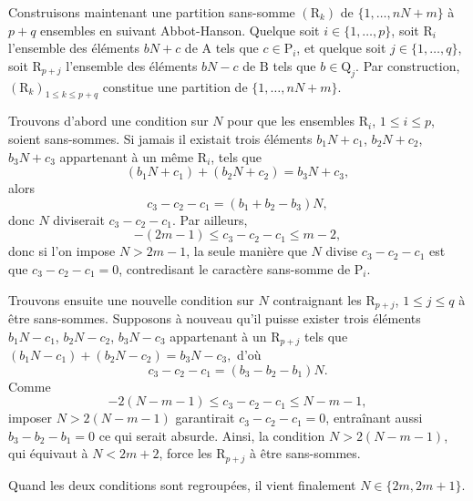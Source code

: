 \documentclass[11pt, oneside]{article}
\begin{document}
Construisons maintenant une partition sans-somme $(\mathrm{R}_k)$ de $\{1, \dots, nN + m \}$ à $p+q$ ensembles en suivant Abbot-Hanson.
Quelque soit $i \in \{1, \dots, p\}$, soit $\mathrm{R}_i$ l'ensemble des éléments $bN + c$ de $\mathrm{A}$ tels que $c \in \mathrm{P}_i$,
et quelque soit $j \in \{1, \dots, q\}$, soit $\mathrm{R}_{p + j}$ l'ensemble des éléments $bN - c$ de $\mathrm{B}$ tels que $b \in \mathrm{Q}_j$.
Par construction, $(\mathrm{R}_k)_{1 \leqslant k \leqslant p+q}$ constitue une partition de $\{1, \dots, nN + m \}$.

Trouvons d'abord une condition sur $N$ pour que les ensembles $\mathrm{R}_i$, $1 \leqslant i \leqslant p$, soient sans-sommes.
Si jamais il existait trois éléments $b_1 N + c_1$, $b_2 N + c_2$, $b_3 N + c_3$ appartenant à un même $\mathrm{R}_i$, tels que
\begin{equation}
 (b_1 N + c_1) + (b_2 N + c_2) = b_3 N + c_3,
\end{equation}
alors
\begin{equation}
 c_3 - c_2 - c_1 = (b_1 + b_2 - b_3)N,
\end{equation}
donc $N$ diviserait $c_3 - c_2 - c_1$. Par ailleurs,
\begin{equation}
 -(2m - 1) \leqslant c_3 - c_2 - c_1 \leqslant m-2,
\end{equation}
donc si l'on impose $N > 2m - 1$, la seule manière que $N$ divise $c_3 - c_2 - c_1$ est que $c_3 - c_2 - c_1 = 0$,
contredisant le caractère sans-somme de $\mathrm{P}_i$.

Trouvons ensuite une nouvelle condition sur $N$ contraignant les $\mathrm{R}_{p + j}$, $1 \leqslant j \leqslant q$ à être sans-sommes.
Supposons à nouveau qu'il puisse exister trois éléments $b_1 N - c_1$, $b_2 N - c_2$, $b_3 N - c_3$ appartenant à un $\mathrm{R}_{p + j}$
tels que $(b_1 N - c_1) + (b_2 N - c_2) = b_3 N - c_3,$ d'où
\begin{equation}
 c_3 - c_2 - c_1 = (b_3 - b_2 - b_1)N.
\end{equation}
Comme
\begin{equation}
 -2(N -m -1) \leqslant c_3 - c_2 - c_1 \leqslant N -m -1,
\end{equation}
imposer $N > 2(N -m -1)$ garantirait $c_3 - c_2 - c_1 = 0$,
entraînant aussi $b_3 - b_2 - b_1 = 0$ ce qui serait absurde.
Ainsi, la condition $N > 2(N -m -1)$, qui équivaut à $N < 2m + 2$, force les $\mathrm{R}_{p + j}$ à être sans-sommes.

Quand les deux conditions sont regroupées, il vient finalement $N \in \{2m, 2m+1\}$.
\end{document}
